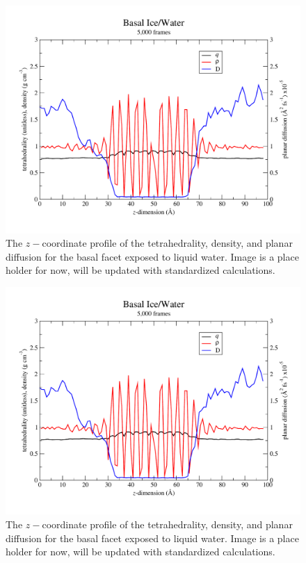\documentclass[aps,jcp,preprint,showpacs,superscriptaddress,groupedaddress]{revtex4}  %
\begin{document}
\newpage   
\begin{figure}
\includegraphics[width=\linewidth]{basal_iw}
\caption{\label{fig:pyramidal_pqD} The $z-$coordinate profile of the tetrahedrality, density, and planar diffusion for the basal facet exposed to liquid water. Image is a place holder for now, will be updated with standardized calculations.}
\end{figure}

\newpage
\begin{figure}
\includegraphics[width=\linewidth]{basal_iw}
\caption{\label{fig:secprism_pqD} The $z-$coordinate profile of the tetrahedrality, density, and planar diffusion for the basal facet exposed to liquid water. Image is a place holder for now, will be updated with standardized calculations.}
\end{figure}
\end{document}
